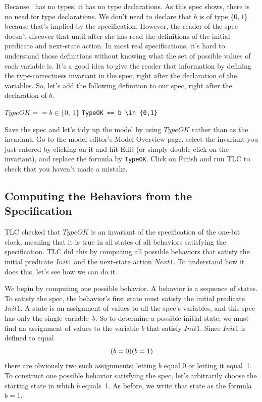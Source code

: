 Because \tlaplus\ has no types, it has no type declarations.  As this
spec shows, there is no need for type declarations.  We don't need to
declare that $b$ is of type $\{0,1\}$ because that's implied by the
specification.  However, the reader of the spec doesn't discover that
until after she has read the definitions of the initial predicate and
next-state action.  In most real specifications, it's hard to
understand those definitions without knowing what the set of possible
values of each variable is.  It's a good idea to give the reader that
information by defining the 
type-correctness invariant in the spec,
right after the declaration of the variables.  So, let's add the
following definition to our spec, right after the declaration of $b$.
\begin{display}
\begin{twocols}
$TypeOK == b \in \{0,\,1\}$
\midcol
\verb|TypeOK == b \in {0,1}|
\end{twocols}
\end{display}
Save the spec and let's tidy up the model by using $TypeOK$ rather
than  as the invariant.  Go to the model
editor's \textsf{Model Overview} page, select the invariant you just
entered by clicking on it and hit \textsf{Edit} (or simply double-click on
the invariant), and replace the formula by \texttt{TypeOK}\@.  Click on
\textsf{Finish} and run TLC to check that you haven't made a mistake.

  \vspace{-\baselineskip}%
\subsection{Computing the Behaviors from the Specification}

TLC checked that $TypeOK$ is an invariant of the specification of
the one-bit clock, meaning that it is true in all states of all
behaviors satisfying the specification.  TLC did this by computing
all possible behaviors that satisfy the initial predicate $Init1$ and
the next-state action $Next1$.  To understand how it does this, let's
see how we can do it.

We begin by computing one possible behavior.  A behavior is a sequence
of states.  To satisfy
the spec, the behavior's first state must satisfy the initial predicate
$Init1$.
A state is an assignment of values to all the spec's
variables, and this spec has only the single variable~$b$.  So to determine
a possible initial state, we must find an assignment of values to the
variable $b$ that satisfy $Init1$.  Since $Init1$ is defined to equal
 \[ (b=0) \/ (b=1) \]
there are obviously two such assignments: letting $b$ equal 0 or
letting it equal~1.  To construct one possible behavior satisfying the
spec, let's arbitrarily choose the starting state in which $b$
equals~1.  As before, we write that state as the formula $b=1$.

